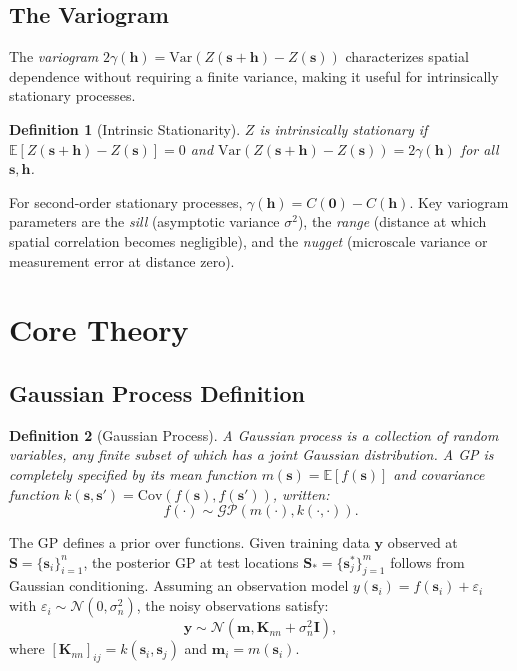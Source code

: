 \documentclass[conference]{IEEEtran}
\newtheorem{definition}{Definition}
\begin{document}
\subsection{The Variogram}

The \emph{variogram} $2\gamma(\mathbf{h}) = \text{Var}(Z(\mathbf{s}+\mathbf{h}) - Z(\mathbf{s}))$ characterizes spatial dependence without requiring a finite variance, making it useful for intrinsically stationary processes.

\begin{definition}[Intrinsic Stationarity]
$Z$ is \emph{intrinsically stationary} if $\mathbb{E}[Z(\mathbf{s}+\mathbf{h}) - Z(\mathbf{s})] = 0$ and $\text{Var}(Z(\mathbf{s}+\mathbf{h}) - Z(\mathbf{s})) = 2\gamma(\mathbf{h})$ for all $\mathbf{s}, \mathbf{h}$.
\end{definition}

For second-order stationary processes, $\gamma(\mathbf{h}) = C(\mathbf{0}) - C(\mathbf{h})$. Key variogram parameters are the \emph{sill} (asymptotic variance $\sigma^2$), the \emph{range} (distance at which spatial correlation becomes negligible), and the \emph{nugget} (microscale variance or measurement error at distance zero).

\section{Core Theory}
\label{sec:theory}

\subsection{Gaussian Process Definition}

\begin{definition}[Gaussian Process]
A \emph{Gaussian process} is a collection of random variables, any finite subset of which has a joint Gaussian distribution. A GP is completely specified by its mean function $m(\mathbf{s}) = \mathbb{E}[f(\mathbf{s})]$ and covariance function $k(\mathbf{s}, \mathbf{s}') = \text{Cov}(f(\mathbf{s}), f(\mathbf{s}'))$, written:
\begin{equation}
  f(\cdot) \sim \mathcal{GP}(m(\cdot), k(\cdot, \cdot)).
  \label{eq:gp_def}
\end{equation}
\end{definition}

The GP defines a prior over functions. Given training data $\mathbf{y}$ observed at $\mathbf{S} = \{\mathbf{s}_i\}_{i=1}^n$, the posterior GP at test locations $\mathbf{S}_* = \{\mathbf{s}_j^*\}_{j=1}^m$ follows from Gaussian conditioning. Assuming an observation model $y(\mathbf{s}_i) = f(\mathbf{s}_i) + \varepsilon_i$ with $\varepsilon_i \sim \mathcal{N}(0, \sigma_n^2)$, the noisy observations satisfy:
\begin{equation}
  \mathbf{y} \sim \mathcal{N}(\mathbf{m}, \mathbf{K}_{nn} + \sigma_n^2 \mathbf{I}),
  \label{eq:marginal_lik}
\end{equation}
where $[\mathbf{K}_{nn}]_{ij} = k(\mathbf{s}_i, \mathbf{s}_j)$ and $\mathbf{m}_i = m(\mathbf{s}_i)$.
\end{document}
